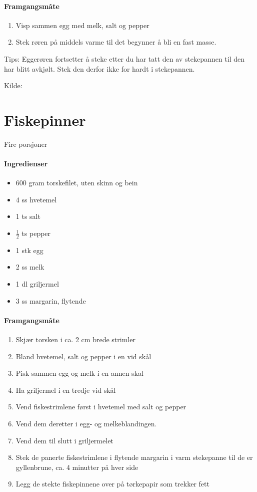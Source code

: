 \documentclass[12pt,a4paper]{book}
\begin{document}
\paragraph{Framgangsmåte}
\begin{enumerate}[noitemsep]
	\item Visp sammen egg med melk, salt og pepper
	\item Stek røren på middels varme til det begynner å bli en fast masse.
\end{enumerate}

Tips: Eggerøren fortsetter å steke etter du har tatt den av stekepannen til den har blitt avkjølt. Stek den derfor ikke for hardt i stekepannen.

Kilde: \href{http://www.matprat.no/sunn/sunne-oppskrifter/sunne-oppskrifter-god-samvittighet/eggerore/}{}
\clearpage{}
\clearpage{}\section{﻿Fiskepinner}
Fire porsjoner

\paragraph{Ingredienser}
\begin{itemize}[noitemsep]
	\item 600 gram  torskefilet, uten skinn og bein
	\item 4 ss hvetemel
	\item 1 ts salt
	\item $\frac{1}{2}$  ts pepper
	\item 1 stk egg
	\item 2 ss melk
	\item 1 dl griljermel
	\item 3 ss margarin, flytende
\end{itemize}


\paragraph{Framgangsmåte}
\begin{enumerate}[noitemsep]
	\item Skjær torsken i ca. 2 cm brede strimler
	\item Bland hvetemel, salt og pepper i en vid skål
	\item Pisk sammen egg og melk i en annen skal
	\item Ha griljermel i en tredje vid skål
	\item Vend fiskestrimlene først i hvetemel med salt og pepper
	\item Vend dem deretter i egg- og melkeblandingen.
	\item Vend dem til slutt i griljermelet
	\item Stek de panerte fiskestrimlene i flytende margarin i varm stekepanne til de er gyllenbrune, ca. 4 minutter på hver side
	\item Legg de stekte fiskepinnene over på tørkepapir som trekker fett
\end{enumerate}
\end{document}
